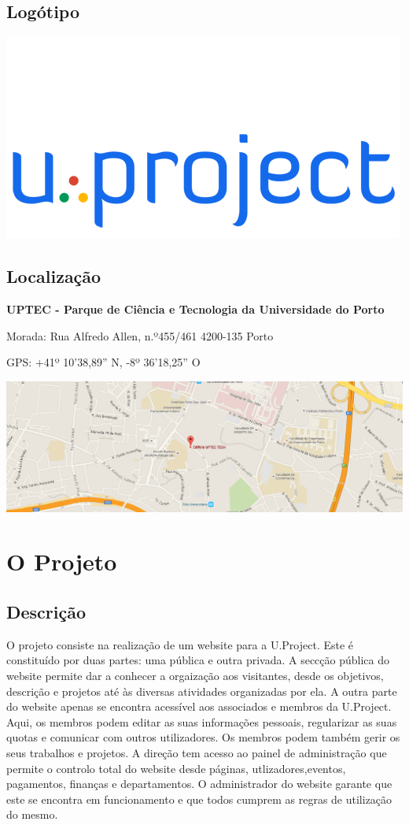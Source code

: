 \documentclass[11pt]{report}
\begin{document}
\section{Logótipo}
\begin{center}
\includegraphics [scale=0.5]{uplogo500.png}
\end{center}
\section{Localização}
\textbf{UPTEC - Parque de Ciência e Tecnologia da Universidade do Porto} 


Morada:
Rua Alfredo Allen, n.º455/461
4200-135 Porto


GPS:
+41º 10'38,89'' N, -8º 36'18,25'' O


\includegraphics [scale=0.35]{location.png}

\newpage

\chapter{O Projeto}
\section{Descrição}
O projeto consiste na realização de um website para a U.Project. Este é constituído por duas partes: uma pública e outra privada.
A seccção pública do website permite dar a conhecer a orgaização aos visitantes, desde os objetivos, descrição e projetos até às diversas atividades organizadas por ela.
A outra parte do website apenas se encontra acessível aos associados e membros da U.Project. Aqui, os membros podem editar as suas informações pessoais, regularizar as suas quotas e comunicar com outros utilizadores.
Os membros podem também gerir os seus trabalhos e projetos.
A direção tem acesso ao painel de administração que permite o controlo total do website desde páginas, utlizadores,eventos, pagamentos, finanças e departamentos.
O administrador do website garante que este se encontra em funcionamento e que todos cumprem as regras de utilização do mesmo.
\end{document}
